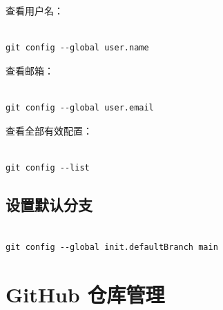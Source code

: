 查看用户名：



\begin{lstlisting}

git config --global user.name

\end{lstlisting}



查看邮箱：



\begin{lstlisting}

git config --global user.email

\end{lstlisting}



查看全部有效配置：



\begin{lstlisting}

git config --list

\end{lstlisting}



\subsection{设置默认分支}



\begin{lstlisting}

git config --global init.defaultBranch main

\end{lstlisting}















\section{GitHub 仓库管理}



